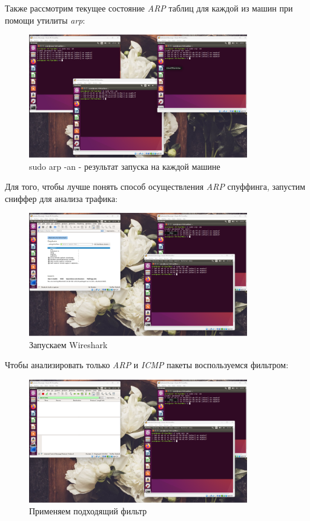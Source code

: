 \documentclass[a4paper]{article}
\begin{document}
  Также рассмотрим текущее состояние \textit{ARP} таблиц для каждой из машин при помощи
  утилиты \textit{arp}:

  \begin{figure}[H]
    \centering
    \includegraphics[width=0.85\textwidth]{02_00 (44)}
    \caption{sudo arp -an - результат запуска на каждой машине}
    \label{img:0033}
  \end{figure}

  Для того, чтобы лучше понять способ осуществления \textit{ARP} спуффинга, запустим
  сниффер для анализа трафика:

  \begin{figure}[H]
    \centering
    \includegraphics[width=0.85\textwidth]{02_00 (45)}
    \caption{Запускаем Wireshark}
    \label{img:0034}
  \end{figure}

  Чтобы анализировать только \textit{ARP} и \textit{ICMP} пакеты воспользуемся фильтром:

  \begin{figure}[H]
    \centering
    \includegraphics[width=0.85\textwidth]{02_00 (46)}
    \caption{Применяем подходящий фильтр}
    \label{img:0035}
  \end{figure}
\end{document}
